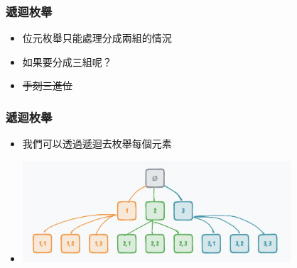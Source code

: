 \documentclass{beamer}
\begin{document}
\begin{frame}
    \frametitle{遞迴枚舉}
    \begin{itemize}
        \item 位元枚舉只能處理分成兩組的情況
        \item 如果要分成三組呢？
        \vspace{0.5cm}
        \item<2-> \sout{手刻三進位}
    \end{itemize}
\end{frame}

\begin{frame}
    \frametitle{遞迴枚舉}
    \begin{itemize}
        \item 我們可以透過遞迴去枚舉每個元素
        \item \includegraphics[width=10.0cm]{img/img_11.png}
    \end{itemize}
\end{frame}
\end{document}
